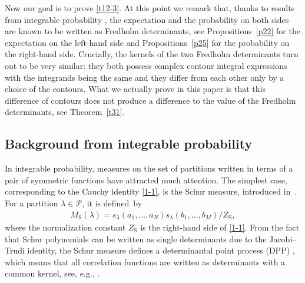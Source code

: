 \documentclass[pdftex]{sigma}
\numberwithin{equation}{section}
\def\l{\lambda}
\def\Pe{\mathcal{P}}
\begin{document}
 Now our goal is to prove \eqref{t12-3}. At this point we remark that, thanks to results from integrable probability \cite{Borodin2007PeriodicSchur,ImamuraSasamoto2019qTASEPtheta}, the expectation and the probability on both sides are known to be written as Fredholm determinants, see Propositions~\ref{p22} for the expectation on the left-hand side and Propositions~\ref{p25} for the probability on the right-hand side.
 Crucially, the kernels of the two Fredholm determinants turn out to be very similar: they both possess complex contour integral expressions with the integrands
 being the same and
 they differ from each other only by a choice of the contours.
 What we actually prove in this paper is that this difference of contours does not produce a difference to the value of the Fredholm determinants, see Theorem~\ref{t31}.


 \subsection{Background from integrable probability}

 In integrable probability, measures on the set of partitions written in terms of a pair of symmetric functions have attracted much attention. The simplest case, corresponding to the Cauchy identity \eqref{1-1}, is the Schur measure, introduced in~\cite{Okounkov2001InfiniteWedge}. For a partition $\l\in\Pe$, it is defined~by
 \begin{align}
 \label{1-15}
 M_{\text{S}}(\l)=s_{\l}(a_1,\dots,a_N)s_{\l}(b_1,\dots,b_M)/Z_{\text{S}},
 \end{align}
 where the normalization constant $Z_{\text{S}}$ is the right-hand side of \eqref{1-1}.
 From the fact that Schur polynomials can be written as single determinants due to the Jacobi--Trudi identity, the Schur measure defines a determinantal point process (DPP) \cite{Okounkov2001InfiniteWedge}, which means that all correlation functions are written as determinants with a common kernel, see, e.g., \cite{Soshnikov2000DPP}.
\end{document}
